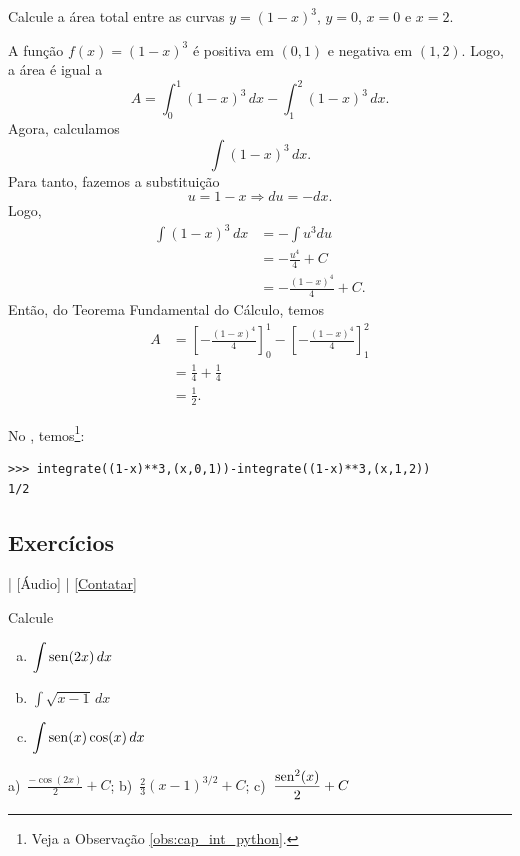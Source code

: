 \begin{exeresol}
  Calcule a área total entre as curvas $y=(1-x)^3$, $y=0$, $x=0$ e $x=2$.
\end{exeresol}
\begin{resol}
  A função $f(x) = (1-x)^3$ é positiva em $(0, 1)$ e negativa em $(1, 2)$. Logo, a área é igual a
  \begin{equation}
    A = \int_0^1 (1-x)^3\,dx - \int_1^2 (1-x)^3\,dx.
  \end{equation}
  Agora, calculamos
  \begin{equation}
    \int (1-x)^3\,dx.
  \end{equation}
  Para tanto, fazemos a substituição
  \begin{equation}
    u = 1-x \Rightarrow du = -dx.
  \end{equation}
  Logo,
  \begin{align}
    \int (1-x)^3\,dx &= -\int u^3du \\
                     &= -\frac{u^4}{4} + C \\
                     &= -\frac{(1-x)^4}{4} + C.
  \end{align}
  Então, do Teorema Fundamental do Cálculo, temos
  \begin{align}
    A &= \left[-\frac{(1-x)^4}{4}\right]_0^1 - \left[-\frac{(1-x)^4}{4}\right]_1^2 \\
      &= \frac{1}{4} + \frac{1}{4} \\
      &= \frac{1}{2}.
  \end{align}

  \ifispython
  No \sympy, temos\footnote{Veja a Observação \ref{obs:cap_int_python}.}:
\begin{verbatim}
>>> integrate((1-x)**3,(x,0,1))-integrate((1-x)**3,(x,1,2))
1/2
\end{verbatim}
  \fi      
\end{resol}

\subsection*{Exercícios}

\begin{flushright}
  [Vídeo] | [Áudio] | \href{https://phkonzen.github.io/notas/contato.html}{[Contatar]}
\end{flushright}

\begin{exer}
  Calcule
  \begin{enumerate}[a)]
  \item $\displaystyle \int \operatorname{sen}(2x)\,dx$
  \item $\displaystyle \int \sqrt{x-1}\,dx$
  \item $\displaystyle \int \operatorname{sen}(x)\cos(x)\,dx$
  \end{enumerate}
\end{exer}
\begin{resp}
  a)~$\displaystyle \frac{-\cos(2x)}{2} + C$; b)~$\displaystyle \frac{2}{3}(x-1)^{3/2} + C$; c)~$\displaystyle \frac{\operatorname{sen}^2(x)}{2} + C$
\end{resp}

